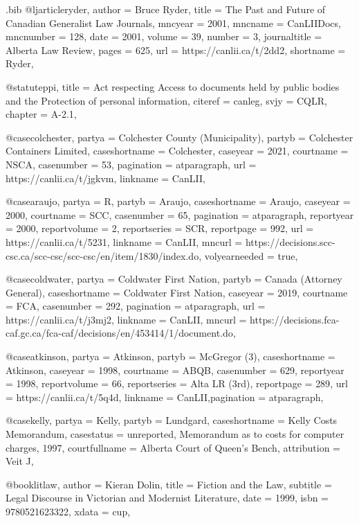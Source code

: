 \begin{filecontents*}[overwrite]{\jobname.bib}
@ljarticle{ryder,	author =  {Bruce Ryder},	title =  {The Past and Future of Canadian Generalist Law Journals},		mncyear =  {2001},	mncname =  {CanLIIDocs},	mncnumber =  {128},	date =  {2001},	volume =  {39},	number =  {3},	journaltitle =  {Alberta Law Review},	pages =  {625},	url =  {https://canlii.ca/t/2dd2},	shortname =  {Ryder},		}

@statute{ppi,	title =  {Act respecting Access to documents held by public bodies and the Protection of personal information},	citeref =  {canleg},	svjy =  {CQLR},	chapter =  {A-2.1},											}


@case{colchester,	partya =  {Colchester County (Municipality)},	partyb =  {Colchester Containers Limited},	caseshortname =  {Colchester},	caseyear =  {2021},	courtname =  {NSCA},	casenumber =  {53},	pagination =  {atparagraph},						url =  {https://canlii.ca/t/jgkvm},	linkname =  {CanLII},									}



@case{araujo,	partya =  {R},	partyb =  {Araujo},	caseshortname =  {Araujo},	caseyear =  {2000},	courtname =  {SCC},	casenumber =  {65},	pagination =  {atparagraph},	reportyear =  {2000},	reportvolume =  {2},		reportseries =  {SCR},	reportpage =  {992},	url =  {https://canlii.ca/t/5231},	linkname =  {CanLII},		mncurl =  {https://decisions.scc-csc.ca/scc-csc/scc-csc/en/item/1830/index.do},					volyearneeded =  {true}, 				}

@case{coldwater,	partya =  {Coldwater First Nation},	partyb =  {Canada (Attorney General)},	caseshortname =  {Coldwater First Nation},	caseyear =  {2019},	courtname =  {FCA},	casenumber =  {292},	pagination =  {atparagraph},						url =  {https://canlii.ca/t/j3mj2},	linkname =  {CanLII},	mncurl =  {https://decisions.fca-caf.gc.ca/fca-caf/decisions/en/453414/1/document.do},								}


@case{atkinson,	partya =  {Atkinson},	partyb =  {McGregor (3)},	caseshortname =  {Atkinson},	caseyear =  {1998},	courtname =  {ABQB},	casenumber =  {629},		reportyear =  {1998},	reportvolume =  {66},		reportseries =  {Alta LR (3rd)},	reportpage =  {289},	url =  {https://canlii.ca/t/5q4d},	linkname =  {CanLII},pagination =  {atparagraph},}


@case{kelly,	partya =  {Kelly},	partyb =  {Lundgard},	caseshortname =  {Kelly Costs Memorandum},															casestatus =  {unreported, Memorandum as to costs for computer charges, 1997},	courtfullname =  {Alberta Court of Queen's Bench},	attribution =  {Veit J},			}

@book{litlaw,	author =  {Kieran Dolin},		title =  {Fiction and the Law},	subtitle =  {Legal Discourse in Victorian and Modernist Literature},			date =  {1999},	isbn =  {9780521623322},			xdata =  {cup},		}


\end{filecontents*}
